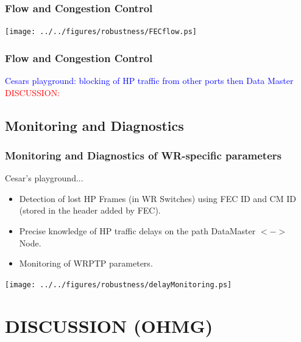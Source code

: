 \documentclass[]{beamer}
\begin{document}
\begin{frame}
  \frametitle{Flow and Congestion Control }
\centering
\texttt{[image: ../../figures/robustness/FECflow.ps]}

\end{frame}


\begin{frame}
  \frametitle{Flow and Congestion Control}   

\textcolor{blue}{Cesars playground: blocking of HP traffic from other ports then
Data Master}
\centering
\textcolor{red}{DISCUSSION:} 

\end{frame}

\subsection{Monitoring and Diagnostics}
\begin{frame}
  \frametitle{Monitoring and Diagnostics of WR-specific parameters}   

Cesar's playground...
\begin{itemize}
 \item Detection of lost HP Frames (in WR Switches) using FEC ID and CM ID
      (stored in the header added by FEC).
 \item Precise knowledge of HP traffic delays on the path DataMaster $<->$ Node.
 \item Monitoring of WRPTP parameters.
\end{itemize}
\centering
\texttt{[image: ../../figures/robustness/delayMonitoring.ps]}

\end{frame}

\section{DISCUSSION (OHMG)}
\end{document}
